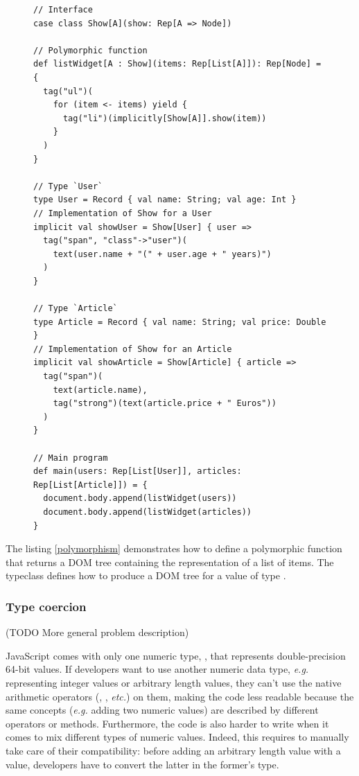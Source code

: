 \documentclass[american,english,runningheads]{llncs}
\newcommand{\eg}{\emph{e.g.}}
\newcommand{\etc}{\emph{etc.}}
\begin{document}
\begin{figure}
\begin{lstlisting}[label=polymorphism,caption=Adhoc polymorphism using typeclasses]
// Interface
case class Show[A](show: Rep[A => Node])

// Polymorphic function
def listWidget[A : Show](items: Rep[List[A]]): Rep[Node] = {
  tag("ul")(
    for (item <- items) yield {
      tag("li")(implicitly[Show[A]].show(item))
    }
  )
}

// Type `User`
type User = Record { val name: String; val age: Int }
// Implementation of Show for a User
implicit val showUser = Show[User] { user =>
  tag("span", "class"->"user")(
    text(user.name + "(" + user.age + " years)")
  )
}

// Type `Article`
type Article = Record { val name: String; val price: Double }
// Implementation of Show for an Article
implicit val showArticle = Show[Article] { article =>
  tag("span")(
    text(article.name),
    tag("strong")(text(article.price + " Euros"))
  )
}

// Main program
def main(users: Rep[List[User]], articles: Rep[List[Article]]) = {
  document.body.append(listWidget(users))
  document.body.append(listWidget(articles))
}
\end{lstlisting}
\end{figure}

The listing \ref{polymorphism} demonstrates how to define a polymorphic  function that returns a DOM
tree containing the representation of a list of items. The  typeclass defines how to produce a DOM tree
for a value of type .

\subsubsection{Type coercion}

(TODO More general problem description)

JavaScript comes with only one numeric type, , that represents double-precision 64-bit values. If
developers want to use another numeric data type, \eg{} representing integer values or arbitrary length values, they
can’t use the native arithmetic operators (\code{+}, \code{-}, \etc) on them, making the code less readable because
the same concepts (\eg{} adding two numeric values) are described by different operators or methods. Furthermore, the
code is also harder to write when it comes to mix different types of numeric values. Indeed, this requires to
manually take care of their compatibility: before adding an arbitrary length value with a  value,
developers have to convert the latter in the former’s type.
\end{document}
